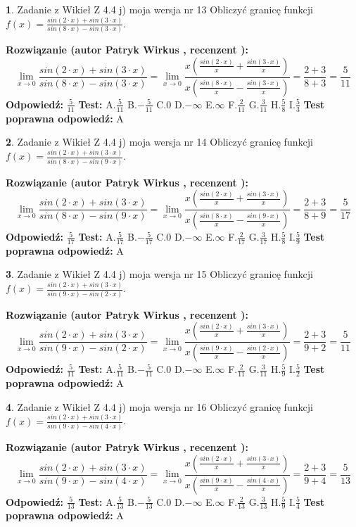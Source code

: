 \documentclass[12pt, a4paper]{article}
\theoremstyle{definition} %
\newtheorem{zad}{}
\newcommand{\zadStart}[1]{\begin{zad}#1\newline}
\newcommand{\zadStop}{\end{zad}}
\newcommand{\rozwStart}[2]{\noindent \textbf{Rozwiązanie (autor #1 , recenzent #2): }\newline}
\newcommand{\rozwStop}{\newline}
\newcommand{\odpStart}{\noindent \textbf{Odpowiedź:}\newline}
\newcommand{\odpStop}{\newline}
\newcommand{\testStart}{\noindent \textbf{Test:}\newline}
\newcommand{\testStop}{\newline}
\newcommand{\kluczStart}{\noindent \textbf{Test poprawna odpowiedź:}\newline}
\newcommand{\kluczStop}{\newline}
\begin{document}
\zadStart{Zadanie z Wikieł Z 4.4 j) moja wersja nr 13}
Obliczyć granicę funkcji $f(x)=\frac{sin(2\cdot x) +sin(3\cdot x)}{sin(8\cdot x) -sin(3\cdot x)}$.
\zadStop
\rozwStart{Patryk Wirkus}{}
$$\lim\limits_{x\to 0}\frac{sin(2\cdot x) +sin(3\cdot x)}{sin(8\cdot x) -sin(3\cdot x)}=\lim\limits_{x\to 0}\frac{x(\frac{sin(2\cdot x)}{x}+\frac{sin(3\cdot x)}{x})}{x(\frac{sin(8\cdot x)}{x}-\frac{sin(3\cdot x)}{x})}=\frac{2+3}{8+3} = \frac{5}{11}$$
\rozwStop
\odpStart
$\frac{5}{11}$
\odpStop
\testStart
A.$\frac{5}{11}$
B.$-\frac{5}{11}$
C.$0$
D.$-\infty$
E.$\infty$
F.$\frac{2}{11}$
G.$\frac{3}{11}$
H.$\frac{5}{8}$
I.$\frac{5}{3}$
\testStop
\kluczStart
A
\kluczStop



\zadStart{Zadanie z Wikieł Z 4.4 j) moja wersja nr 14}
Obliczyć granicę funkcji $f(x)=\frac{sin(2\cdot x) +sin(3\cdot x)}{sin(8\cdot x) -sin(9\cdot x)}$.
\zadStop
\rozwStart{Patryk Wirkus}{}
$$\lim\limits_{x\to 0}\frac{sin(2\cdot x) +sin(3\cdot x)}{sin(8\cdot x) -sin(9\cdot x)}=\lim\limits_{x\to 0}\frac{x(\frac{sin(2\cdot x)}{x}+\frac{sin(3\cdot x)}{x})}{x(\frac{sin(8\cdot x)}{x}-\frac{sin(9\cdot x)}{x})}=\frac{2+3}{8+9} = \frac{5}{17}$$
\rozwStop
\odpStart
$\frac{5}{17}$
\odpStop
\testStart
A.$\frac{5}{17}$
B.$-\frac{5}{17}$
C.$0$
D.$-\infty$
E.$\infty$
F.$\frac{2}{17}$
G.$\frac{3}{17}$
H.$\frac{5}{8}$
I.$\frac{5}{9}$
\testStop
\kluczStart
A
\kluczStop



\zadStart{Zadanie z Wikieł Z 4.4 j) moja wersja nr 15}
Obliczyć granicę funkcji $f(x)=\frac{sin(2\cdot x) +sin(3\cdot x)}{sin(9\cdot x) -sin(2\cdot x)}$.
\zadStop
\rozwStart{Patryk Wirkus}{}
$$\lim\limits_{x\to 0}\frac{sin(2\cdot x) +sin(3\cdot x)}{sin(9\cdot x) -sin(2\cdot x)}=\lim\limits_{x\to 0}\frac{x(\frac{sin(2\cdot x)}{x}+\frac{sin(3\cdot x)}{x})}{x(\frac{sin(9\cdot x)}{x}-\frac{sin(2\cdot x)}{x})}=\frac{2+3}{9+2} = \frac{5}{11}$$
\rozwStop
\odpStart
$\frac{5}{11}$
\odpStop
\testStart
A.$\frac{5}{11}$
B.$-\frac{5}{11}$
C.$0$
D.$-\infty$
E.$\infty$
F.$\frac{2}{11}$
G.$\frac{3}{11}$
H.$\frac{5}{9}$
I.$\frac{5}{2}$
\testStop
\kluczStart
A
\kluczStop



\zadStart{Zadanie z Wikieł Z 4.4 j) moja wersja nr 16}
Obliczyć granicę funkcji $f(x)=\frac{sin(2\cdot x) +sin(3\cdot x)}{sin(9\cdot x) -sin(4\cdot x)}$.
\zadStop
\rozwStart{Patryk Wirkus}{}
$$\lim\limits_{x\to 0}\frac{sin(2\cdot x) +sin(3\cdot x)}{sin(9\cdot x) -sin(4\cdot x)}=\lim\limits_{x\to 0}\frac{x(\frac{sin(2\cdot x)}{x}+\frac{sin(3\cdot x)}{x})}{x(\frac{sin(9\cdot x)}{x}-\frac{sin(4\cdot x)}{x})}=\frac{2+3}{9+4} = \frac{5}{13}$$
\rozwStop
\odpStart
$\frac{5}{13}$
\odpStop
\testStart
A.$\frac{5}{13}$
B.$-\frac{5}{13}$
C.$0$
D.$-\infty$
E.$\infty$
F.$\frac{2}{13}$
G.$\frac{3}{13}$
H.$\frac{5}{9}$
I.$\frac{5}{4}$
\testStop
\kluczStart
A
\kluczStop
\end{document}
